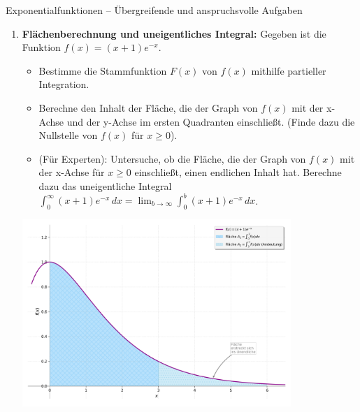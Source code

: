 \begin{aufgabenumgebung}{Exponentialfunktionen – Übergreifende und anspruchsvolle Aufgaben}
\begin{enumerate}
    \item \textbf{Flächenberechnung und uneigentliches Integral:}
        Gegeben ist die Funktion $f(x) = (x+1)e^{-x}$.
        \begin{itemize}
            \item Bestimme die Stammfunktion $F(x)$ von $f(x)$ mithilfe partieller Integration.
            \item Berechne den Inhalt der Fläche, die der Graph von $f(x)$ mit der x-Achse und der y-Achse im ersten Quadranten einschließt. (Finde dazu die Nullstelle von $f(x)$ für $x \ge 0$).
            \item (Für Experten): Untersuche, ob die Fläche, die der Graph von $f(x)$ mit der x-Achse für $x \ge 0$ einschließt, einen endlichen Inhalt hat. Berechne dazu das uneigentliche Integral $\int_0^\infty (x+1)e^{-x} \,dx = \lim_{b \to \infty} \int_0^b (x+1)e^{-x} \,dx$.
        \end{itemize}
            \begin{center}
                \includegraphics[width=0.8\textwidth]{grafiken/Integral_Flaeche_xplus1ehochminusx.png}
                \label{fig:flaeche_xplus1ehochminusx}
            \end{center}
            

\end{enumerate}
\end{aufgabenumgebung}
